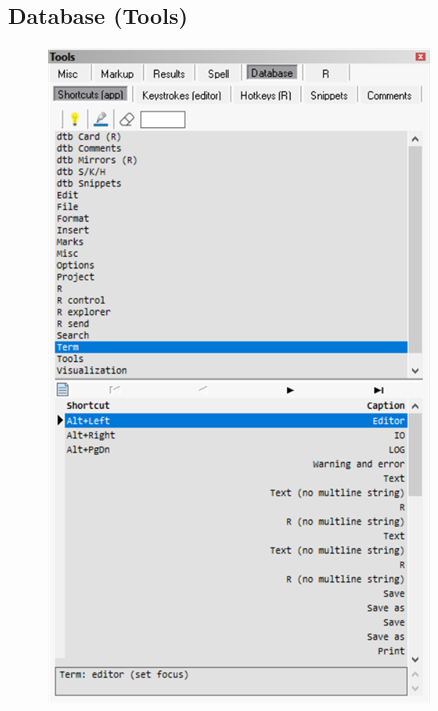 \hypertarget{working_tools_database}{}
\subsection{Database (Tools)}

\begin{figure}[H]
  \includegraphics[scale=0.35]{./res/tools_database_shortcuts.png}~~

\end{figure}
